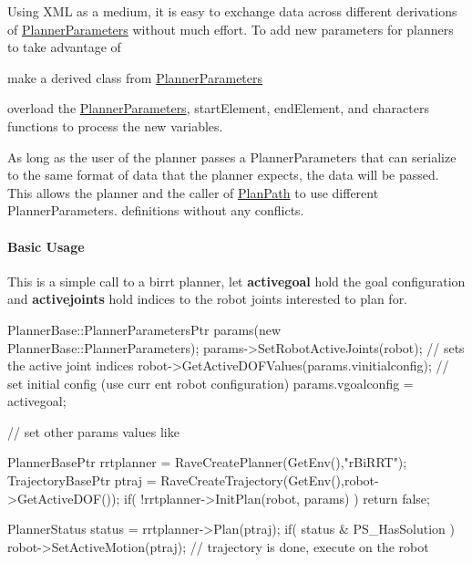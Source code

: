Using XML as a medium, it is easy to exchange data across different derivations of \hyperlink{classOpenRAVE_1_1PlannerBase_1_1PlannerParameters}{PlannerParameters} without much effort. To add new parameters for planners to take advantage of


\begin{DoxyItemize}
\item make a derived class from \hyperlink{classOpenRAVE_1_1PlannerBase_1_1PlannerParameters}{PlannerParameters}
\item overload the \hyperlink{classOpenRAVE_1_1PlannerBase_1_1PlannerParameters_a2084222cd1b9f555406d306d65680d7b}{PlannerParameters}, startElement, endElement, and characters functions to process the new variables.
\end{DoxyItemize}

As long as the user of the planner passes a {\ttfamily PlannerParameters} that can serialize to the same format of data that the planner expects, the data will be passed. This allows the planner and the caller of \hyperlink{classOpenRAVE_1_1PlannerBase_a7ce22311b1f81ec6b9bacdf457d4631a}{PlanPath} to use different {\ttfamily PlannerParameters}. definitions without any conflicts.\hypertarget{arch__planner_planner_basicusage}{}\paragraph{Basic Usage}\label{arch__planner_planner_basicusage}
This is a simple call to a birrt planner, let {\bfseries activegoal} hold the goal configuration and {\bfseries activejoints} hold indices to the robot joints interested to plan for.


\begin{DoxyCode}
PlannerBase::PlannerParametersPtr params(new PlannerBase::PlannerParameters);
params->SetRobotActiveJoints(robot); // sets the active joint indices 
robot->GetActiveDOFValues(params.vinitialconfig); // set initial config (use curr
      ent robot configuration)
params.vgoalconfig = activegoal;
 
// set other params values like
 
PlannerBasePtr rrtplanner = RaveCreatePlanner(GetEnv(),"rBiRRT");
TrajectoryBasePtr ptraj = RaveCreateTrajectory(GetEnv(),robot->GetActiveDOF());
if( !rrtplanner->InitPlan(robot, params) ) {
    return false;
}

PlannerStatus status = rrtplanner->Plan(ptraj);
if( status & PS_HasSolution ) {
    robot->SetActiveMotion(ptraj); // trajectory is done, execute on the robot
}
\end{DoxyCode}


